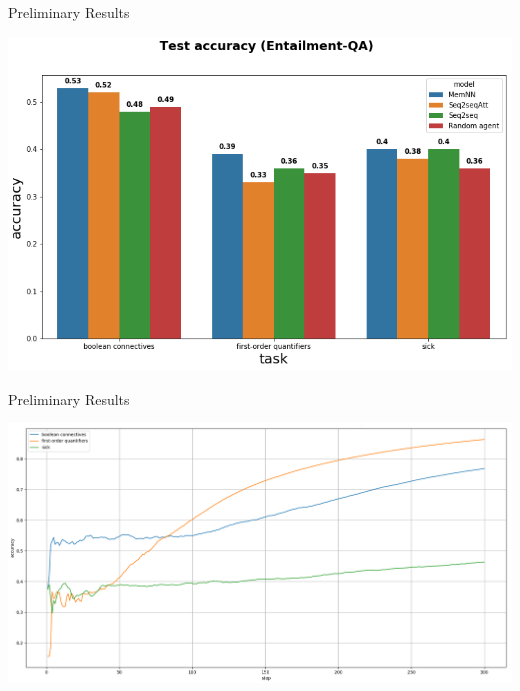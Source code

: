 \documentclass[10pt]{beamer}
\begin{document}
\begin{frame}{Preliminary Results}
\begin{center}
\includegraphics[scale=0.42]{images/comparative_results.png}
\end{center}
\end{frame}



\begin{frame}{Preliminary Results}
\begin{center}
\includegraphics[scale=0.28]{images/training_acc_EntailQA_mem.png}
\end{center}
\end{frame}
\end{document}
